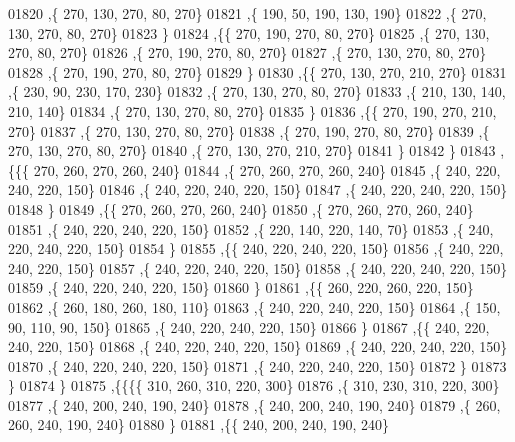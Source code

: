 \begin{DoxyCode}
01820     ,\{   270,   130,   270,    80,   270\}
01821     ,\{   190,    50,   190,   130,   190\}
01822     ,\{   270,   130,   270,    80,   270\}
01823     \}
01824    ,\{\{   270,   190,   270,    80,   270\}
01825     ,\{   270,   130,   270,    80,   270\}
01826     ,\{   270,   190,   270,    80,   270\}
01827     ,\{   270,   130,   270,    80,   270\}
01828     ,\{   270,   190,   270,    80,   270\}
01829     \}
01830    ,\{\{   270,   130,   270,   210,   270\}
01831     ,\{   230,    90,   230,   170,   230\}
01832     ,\{   270,   130,   270,    80,   270\}
01833     ,\{   210,   130,   140,   210,   140\}
01834     ,\{   270,   130,   270,    80,   270\}
01835     \}
01836    ,\{\{   270,   190,   270,   210,   270\}
01837     ,\{   270,   130,   270,    80,   270\}
01838     ,\{   270,   190,   270,    80,   270\}
01839     ,\{   270,   130,   270,    80,   270\}
01840     ,\{   270,   130,   270,   210,   270\}
01841     \}
01842    \}
01843   ,\{\{\{   270,   260,   270,   260,   240\}
01844     ,\{   270,   260,   270,   260,   240\}
01845     ,\{   240,   220,   240,   220,   150\}
01846     ,\{   240,   220,   240,   220,   150\}
01847     ,\{   240,   220,   240,   220,   150\}
01848     \}
01849    ,\{\{   270,   260,   270,   260,   240\}
01850     ,\{   270,   260,   270,   260,   240\}
01851     ,\{   240,   220,   240,   220,   150\}
01852     ,\{   220,   140,   220,   140,    70\}
01853     ,\{   240,   220,   240,   220,   150\}
01854     \}
01855    ,\{\{   240,   220,   240,   220,   150\}
01856     ,\{   240,   220,   240,   220,   150\}
01857     ,\{   240,   220,   240,   220,   150\}
01858     ,\{   240,   220,   240,   220,   150\}
01859     ,\{   240,   220,   240,   220,   150\}
01860     \}
01861    ,\{\{   260,   220,   260,   220,   150\}
01862     ,\{   260,   180,   260,   180,   110\}
01863     ,\{   240,   220,   240,   220,   150\}
01864     ,\{   150,    90,   110,    90,   150\}
01865     ,\{   240,   220,   240,   220,   150\}
01866     \}
01867    ,\{\{   240,   220,   240,   220,   150\}
01868     ,\{   240,   220,   240,   220,   150\}
01869     ,\{   240,   220,   240,   220,   150\}
01870     ,\{   240,   220,   240,   220,   150\}
01871     ,\{   240,   220,   240,   220,   150\}
01872     \}
01873    \}
01874   \}
01875  ,\{\{\{\{   310,   260,   310,   220,   300\}
01876     ,\{   310,   230,   310,   220,   300\}
01877     ,\{   240,   200,   240,   190,   240\}
01878     ,\{   240,   200,   240,   190,   240\}
01879     ,\{   260,   260,   240,   190,   240\}
01880     \}
01881    ,\{\{   240,   200,   240,   190,   240\}

\end{DoxyCode}
